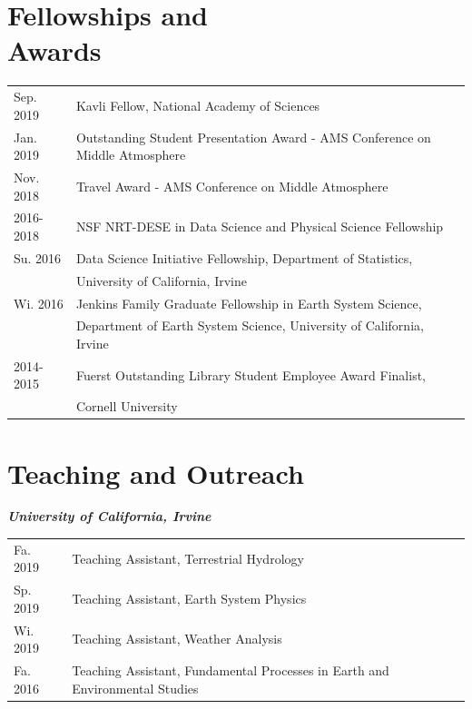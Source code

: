 \documentclass[margin,line,palatino,courier,10pt]{res}
\begin{document}
\begin{resume}
\section{\sc \textcolor{Cerulean}{\large{\textbf{Fellowships and\\ Awards}}}}
\begin{tabular}{@{}p{0.9in}p{4in}}
Sep. 2019 & Kavli Fellow, National Academy of Sciences\\
Jan. 2019 & Outstanding Student Presentation Award - AMS Conference on Middle Atmosphere\\
Nov. 2018 & Travel Award - AMS Conference on Middle Atmosphere\\
2016-2018 & NSF NRT-DESE in Data Science and Physical Science Fellowship\\
Su. 2016 & Data Science Initiative Fellowship, Department of Statistics, \\
& University of California, Irvine\\
Wi. 2016 & Jenkins Family Graduate Fellowship in Earth System Science,\\ 
& Department of Earth System
Science, University of California, Irvine\\
2014-2015 & Fuerst Outstanding Library Student Employee Award Finalist,\\
& Cornell University
\end{tabular}


\vspace{-0.1in}
\noindent\textcolor{Cerulean}{\makebox[\linewidth][r]{\rule{\textwidth}{5pt}}}
\vspace{-0.3in}

\section{\sc \textcolor{Cerulean}{\large{\textbf{Teaching and Outreach}}}}

\textit{\textbf{University of California, Irvine}}
\vspace*{0.05in}\\
\begin{tabular}{@{}p{0.9in}p{4in}}
Fa. 2019 & Teaching Assistant, Terrestrial Hydrology\\
Sp. 2019 & Teaching Assistant, Earth System Physics\\
Wi. 2019 & Teaching Assistant, Weather Analysis\\
Fa. 2016 & Teaching Assistant, Fundamental Processes in Earth and Environmental Studies\\
\end{tabular}


\end{resume}
\end{document}
